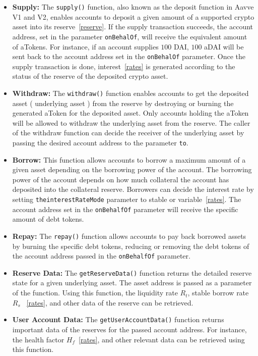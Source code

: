 \documentclass[11pt,a4paper]{report}
\begin{document}
\begin{itemize}
	\item{\textbf{Supply:}} The \verb|supply()| function, also known as the deposit function in Aavve V1 and V2, enables accounts to deposit a given amount of a supported crypto asset into its reserve~\ref{reserve}. If the supply transaction succeeds, the account address, set in the parameter \verb|onBehalOf|, will receive the equivalent amount of aTokens. For instance, if an account supplies $100$ DAI, $100$ aDAI will be sent back to the account address set in the \verb|onBehalOf| parameter. Once the supply transaction is done, interest~\ref{rates} is generated according to the status of the reserve of the deposited crypto asset.
	\item{\textbf{Withdraw:}} The \verb|withdraw()| function enables accounts to get the deposited asset ( underlying asset ) from the reserve by destroying or burning the generated aToken for the deposited asset. Only accounts holding the aToken will be allowed to withdraw the underlying asset from the reserve. The caller of the withdraw function can decide the receiver of the underlying asset by passing the desired account address to the parameter \verb|to|.
	\item{\textbf{Borrow:}} This function allows accounts to borrow a maximum amount of a given asset depending on the borrowing power of the account. The borrowing power of the account depends on how much collateral the account has deposited into the collateral reserve. Borrowers can decide the interest rate by setting \verb|theinterestRateMode| parameter to stable or variable~\ref{rates}. The account address set in the \verb|onBehalfOf| parameter will receive the specific amount of debt tokens.
	\item{\textbf{Repay:}} The \verb|repay()| function allows accounts to pay back borrowed assets by burning the specific debt tokens, reducing or removing the debt tokens of the account address passed in the \verb|onBehalfOf| parameter. 
	\item{\textbf{Reserve Data:}}\label{reserveData} The \verb|getReserveData()| function returns the detailed reserve state for a given underlying asset. The asset address is passed as a parameter of the function. Using this function, the liquidity rate $R_{t}$, stable borrow rate $R_{s}$ ~\ref{rates}, and other data of the reserve can be retrieved. 
	\item{\textbf{User Account Data:}} The \verb|getUserAccountData()| function returns important data of the reserves for the passed account address. For instance, the health factor $H_{f}$~\ref{rates}, and other relevant data can be retrieved using this function.
\end{itemize}
\end{document}
